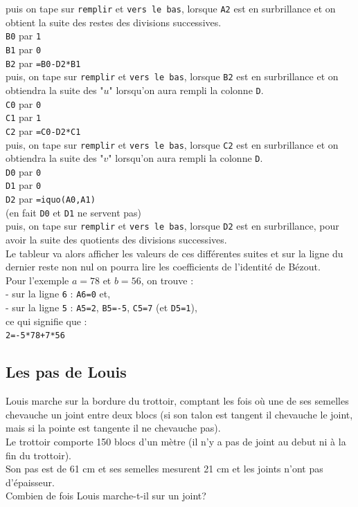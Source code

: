 \documentclass[a4paper,11pt]{book}
\begin{document}
puis on tape sur {\tt remplir} et {\tt vers le bas}, lorsque {\tt A2} est en 
surbrillance et on obtient la suite des restes des divisions successives.\\
{\tt B0} par {\tt 1}\\
{\tt B1} par {\tt 0}\\ 
{\tt B2} par {\tt =B0-D2*B1}\\
puis, on tape sur {\tt remplir} et {\tt vers le bas}, lorsque {\tt B2} est en
 surbrillance et on obtiendra la suite des "$u$" lorsqu'on aura rempli la 
colonne {\tt D}.\\
{\tt C0} par {\tt 0}\\
{\tt C1} par {\tt 1}\\
{\tt C2} par {\tt =C0-D2*C1}\\
puis, on tape sur {\tt remplir}  et {\tt vers le bas}, lorsque {\tt C2} est en 
surbrillance et on obtiendra la suite des "$v$" lorsqu'on aura rempli la 
colonne {\tt D}.\\
{\tt D0} par {\tt 0}\\
{\tt D1} par {\tt 0}\\
{\tt D2} par {\tt =iquo(A0,A1)}\\
(en fait {\tt D0} et {\tt D1} ne servent pas)\\
puis, on tape sur {\tt remplir}  et {\tt vers le bas}, lorsque {\tt D2} est 
en surbrillance,
pour avoir la suite des quotients des divisions successives.\\
Le tableur va alors afficher les valeurs de ces diff\'erentes suites et sur la 
ligne du dernier reste non nul on pourra lire les coefficients de l'identit\'e 
de B\'ezout.\\
Pour l'exemple $a=78$ et $b=56$, on trouve :\\
- sur la ligne {\tt 6} : {\tt A6=0} et,\\
- sur la ligne {\tt 5} : {\tt A5=2}, {\tt B5=-5}, {\tt C5=7} (et {\tt D5=1}),\\
ce qui signifie que :\\
{\tt 2=-5*78+7*56}
\subsection{Les pas de Louis}
Louis marche sur la bordure du trottoir, comptant les fois o\`u une de ses 
semelles chevauche un joint entre deux blocs (si son talon est tangent il 
chevauche le joint, mais si la pointe est tangente il ne chevauche pas).\\
Le trottoir comporte 150 blocs d'un m\`etre (il n'y a pas de joint au debut ni
\`a la fin du trottoir).\\
Son pas est de 61 cm et ses semelles mesurent 21 cm et les joints n'ont pas 
d'\'epaisseur.\\ 
Combien de fois Louis marche-t-il sur un joint?\\
\end{document}
